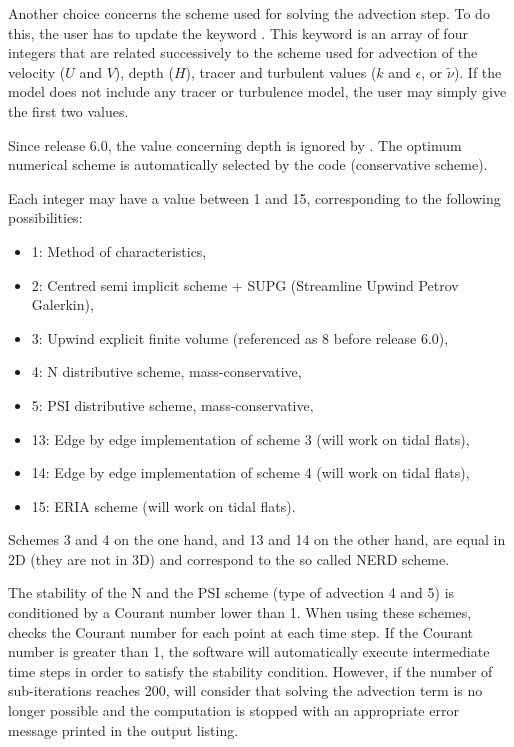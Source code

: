 Another choice concerns the scheme used for solving the advection step.
To do this, the user has to update the keyword .
This keyword is an array of four integers that are related successively
to the scheme used for advection of the velocity ($U$ and $V$), depth ($H$),
tracer and turbulent values ($k$ and $\epsilon$, or $\tilde{\nu}$).
If the model does not include any tracer or turbulence model,
the user may simply give the first two values.

Since release 6.0, the value concerning depth is ignored by .
The optimum numerical scheme is automatically selected by the code
(conservative scheme).

Each integer may have a value between 1 and 15, corresponding to the following
possibilities:

\begin{itemize}
\item 1: Method of characteristics,

\item 2: Centred semi implicit scheme + SUPG
(Streamline Upwind Petrov Galerkin),

\item 3: Upwind explicit finite volume
(referenced as 8 before release 6.0),

\item 4: N distributive scheme, mass-conservative,

\item 5: PSI distributive scheme, mass-conservative,
%

\item 13: Edge by edge implementation of scheme 3
(will work on tidal flats),

\item 14: Edge by edge implementation of scheme 4
(will work on tidal flats),

\item 15: ERIA scheme (will work on tidal flats).
\end{itemize}

Schemes 3 and 4 on the one hand, and 13 and 14 on the other hand, are equal
in 2D (they are not in 3D) and correspond to the so called NERD scheme.

The stability of the N and the PSI scheme (type of advection 4 and 5)
is conditioned by a Courant number lower than 1.
When using these schemes,  checks the Courant number
for each point at each time step.
If the Courant number is greater than 1, the software will automatically execute
intermediate time steps in order to satisfy the stability condition.
However, if the number of sub-iterations reaches 200,  will consider
that solving the advection term is no longer possible and the computation is
stopped with an appropriate error message printed in the output listing.

